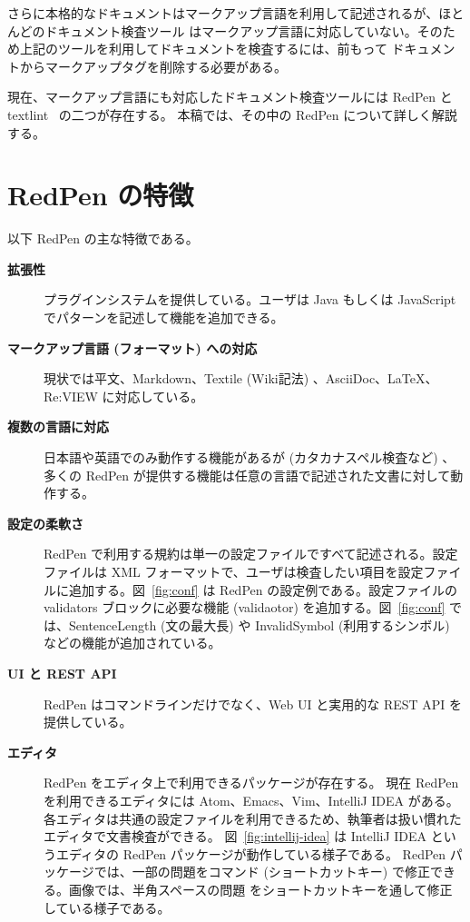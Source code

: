 さらに本格的なドキュメントはマークアップ言語を利用して記述されるが、ほとんどのドキュメント検査ツール
はマークアップ言語に対応していない。そのため上記のツールを利用してドキュメントを検査するには、前もって
ドキュメントからマークアップタグを削除する必要がある。

現在、マークアップ言語にも対応したドキュメント検査ツールには RedPen と textlint~\cite{textlint} の二つが存在する。
本稿では、その中の RedPen について詳しく解説する。

\section{RedPen の特徴}

以下 RedPen の主な特徴である。

\begin{description}
\item[{\bf 拡張性}]
  プラグインシステムを提供している。ユーザは Java もしくは JavaScript でパターンを記述して機能を追加できる。

\item[{\bf マークアップ言語 (フォーマット) への対応}]
  現状では平文、Markdown、Textile (Wiki記法) 、AsciiDoc、LaTeX、Re:VIEW に対応している。

\item[{\bf 複数の言語に対応}]
  日本語や英語でのみ動作する機能があるが (カタカナスペル検査など) 、多くの RedPen が提供する機能は任意の言語で記述された文書に対して動作する。

\item[{\bf 設定の柔軟さ}]
  RedPen で利用する規約は単一の設定ファイルですべて記述される。設定ファイルは XML フォーマットで、ユーザは検査したい項目を設定ファイルに追加する。図~\ref{fig:conf} は RedPen の設定例である。設定ファイルの validators ブロックに必要な機能 (validaotor) を追加する。図~\ref{fig:conf} では、SentenceLength (文の最大長) や InvalidSymbol (利用するシンボル) などの機能が追加されている。

\item[{\bf UI と REST API}]
  RedPen はコマンドラインだけでなく、Web UI と実用的な REST API を提供している。

\item[{\bf エディタ}]
  RedPen をエディタ上で利用できるパッケージが存在する。
  現在 RedPen を利用できるエディタには Atom、Emacs、Vim、IntelliJ IDEA がある。
  各エディタは共通の設定ファイルを利用できるため、執筆者は扱い慣れたエディタで文書検査ができる。
  図~\ref{fig:intellij-idea} は IntelliJ IDEA というエディタの RedPen パッケージが動作している様子である。
  RedPen パッケージでは、一部の問題をコマンド (ショートカットキー) で修正できる。画像では、半角スペースの問題
  をショートカットキーを通して修正している様子である。
\end{description}

